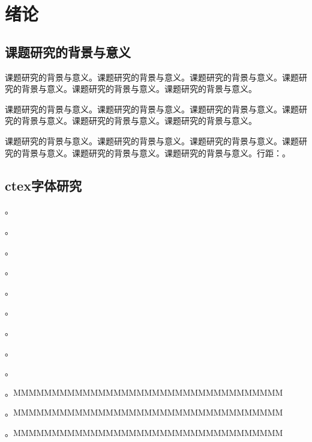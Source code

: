 \documentclass{csuthesis}
\begin{document}
    \tableofcontents
    
    \cleardoublepage
    \mainmatter
	\renewcommand{\chaptermark}[1]{\markboth{\thechapter \hspace{0.8em}#1}{}}  %
    \chapter{绪论}
    \thispagestyle{mainstyle} %
    \section{课题研究的背景与意义}

    课题研究的背景与意义。课题研究的背景与意义。课题研究的背景与意义。课题研究的背景与意义。课题研究的背景与意义。课题研究的背景与意义。

    课题研究的背景与意义。课题研究的背景与意义。课题研究的背景与意义。课题研究的背景与意义。课题研究的背景与意义。课题研究的背景与意义。

    课题研究的背景与意义。课题研究的背景与意义。课题研究的背景与意义。课题研究的背景与意义。课题研究的背景与意义。课题研究的背景与意义。行距：\the\baselineskip。
    
    \section{ctex字体研究}
    
    {\noindent {} 。}
    
    {\noindent {} 。}
    
    {\noindent {} 。}
    
    {\noindent {} 。}
    
    {\noindent {} 。}
    
    {\noindent {} 。}
    
    {\noindent {} 。}
    
    {\noindent {} 。}
    
    {\noindent {} 。}
    
    {\noindent {} 。MMMMMMMMMMMMMMMMMMMMMMMMMMMMMMMMMMM}
    
    \noindent {}。MMMMMMMMMMMMMMMMMMMMMMMMMMMMMMMMMMM
    
    {\noindent {} 。MMMMMMMMMMMMMMMMMMMMMMMMMMMMMMMMMMM}
    
\end{document}
